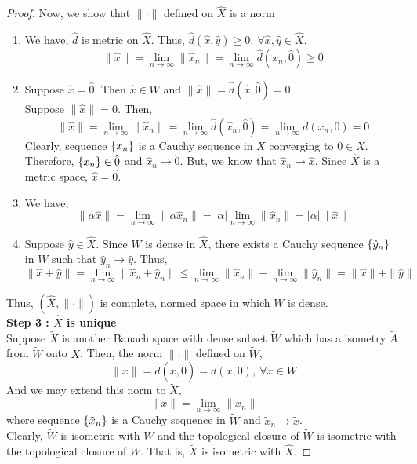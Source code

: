 \begin{proof}
	Now, we show that $\| \cdot \|$ defined on $\hat{X}$ is a norm
	\begin{enumerate}
		\item We have, $\hat{d}$ is metric on $\hat{X}$. Thus, $\hat{d}(\hat{x},\hat{y}) \ge 0,\ \forall \hat{x},\hat{y} \in \hat{X}$.
			$$ \| \hat{x} \| = \lim_{n \to \infty} \| \hat{x}_n \| = \lim_{n \to \infty} \hat{d}(\hat{x}_n,\hat{0}) \ge 0 $$
		\item Suppose $\hat{x} = \hat{0}$.
			Then $\hat{x} \in W$ and $\|\hat{x}\| = \hat{d}(\hat{x},\hat{0}) = 0$.\\
			Suppose $\|\hat{x}\| = 0$.
			Then,
			$$ \| \hat{x} \| = \lim_{n \to \infty} \| \hat{x}_n \| = \lim_{n \to \infty} \hat{d}(\hat{x}_n,\hat{0}) = \lim_{n \to \infty} d(x_n,0) = 0 $$
			Clearly, sequence $\{x_n\}$ is a Cauchy sequence in $X$ converging to $0 \in X$.
			Therefore, $\{x_n\} \in \hat{0}$ and $\hat{x}_n \to \hat{0}$.
			But, we know that $\hat{x}_n \to \hat{x}$.
			Since $\hat{X}$ is a metric space, $\hat{x} = \hat{0}$.
		\item We have,
			$$ \| \alpha \hat{x} \| = \lim_{n \to \infty} \| \alpha \hat{x}_n \| = |\alpha|\lim_{n \to \infty} \| \hat{x}_n \| = |\alpha|\|\hat{x}\|$$
		\item Suppose $\hat{y} \in \hat{X}$.
			Since $W$ is dense in $\hat{X}$, there exists a Cauchy sequence $\{\hat{y}_n\}$ in $W$ such that $\hat{y}_n \to \hat{y}$.
			Thus,
			$$ \| \hat{x} + \hat{y} \| = \lim_{n \to \infty} \| \hat{x}_n + \hat{y}_n \| \le \lim_{n \to \infty} \| \hat{x}_n \| + \lim_{n \to \infty} \| \hat{y}_n \| = \| \hat{x} \| + \| \hat{y} \| $$
	\end{enumerate}
	Thus, $(\hat{X},\|\cdot\|)$ is complete, normed space in which $W$ is dense.\\

	\textbf{Step 3 : $\hat{X}$ is unique}\\
	Suppose $\tilde{X}$ is another Banach space with dense subset $\tilde{W}$ which has a isometry $\tilde{A}$ from $\tilde{W}$ onto $X$.
	Then, the norm $\|\cdot\|$ defined on $\tilde{W}$,
	$$ \| \tilde{x} \| = \tilde{d}(\tilde{x},\tilde{0}) = d(x,0),\ \forall \tilde{x} \in \tilde{W} $$
	And we may extend this norm to $\tilde{X}$,
	$$ \| \tilde{x} \| = \lim_{n \to \infty} \| \tilde{x}_n \| $$
	where sequence $\{\tilde{x}_n\}$ is a Cauchy sequence in $\tilde{W}$ and $\tilde{x}_n \to \tilde{x}$.\\

	Clearly, $\tilde{W}$ is isometric with $W$ and the topological closure of $\tilde{W}$ is isometric with the topological closure of $W$.
	That is, $\tilde{X}$ is isometric with $\hat{X}$.
\end{proof}

